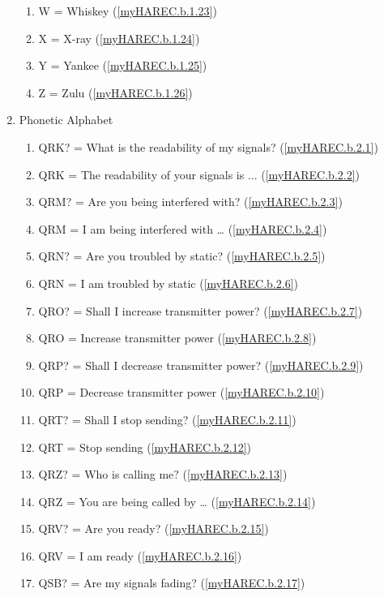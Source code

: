 \begin{enumerate}[noitemsep]
\begin{enumerate}[noitemsep]
\item W = Whiskey (\ref{myHAREC.b.1.23})\label{HAREC.b.1.23}
\item X = X-ray (\ref{myHAREC.b.1.24})\label{HAREC.b.1.24}
\item Y = Yankee (\ref{myHAREC.b.1.25})\label{HAREC.b.1.25}
\item Z = Zulu (\ref{myHAREC.b.1.26})\label{HAREC.b.1.26}
\end{enumerate}
\item Phonetic Alphabet
\begin{enumerate}[noitemsep]
\item QRK? = What is the readability of my signals? (\ref{myHAREC.b.2.1})\label{HAREC.b.2.1}
\item QRK  = The readability of your signals is ... (\ref{myHAREC.b.2.2})\label{HAREC.b.2.2}
\item QRM? = Are you being interfered with? (\ref{myHAREC.b.2.3})\label{HAREC.b.2.3}
\item QRM  = I am being interfered with … (\ref{myHAREC.b.2.4})\label{HAREC.b.2.4}
\item QRN? = Are you troubled by static? (\ref{myHAREC.b.2.5})\label{HAREC.b.2.5}
\item QRN  = I am troubled by static (\ref{myHAREC.b.2.6})\label{HAREC.b.2.6}
\item QRO? = Shall I increase transmitter power? (\ref{myHAREC.b.2.7})\label{HAREC.b.2.7}
\item QRO  = Increase transmitter power (\ref{myHAREC.b.2.8})\label{HAREC.b.2.8}
\item QRP? = Shall I decrease transmitter power? (\ref{myHAREC.b.2.9})\label{HAREC.b.2.9}
\item QRP  = Decrease transmitter power (\ref{myHAREC.b.2.10})\label{HAREC.b.2.10}
\item QRT? = Shall I stop sending? (\ref{myHAREC.b.2.11})\label{HAREC.b.2.11}
\item QRT  = Stop sending (\ref{myHAREC.b.2.12})\label{HAREC.b.2.12}
\item QRZ? = Who is calling me? (\ref{myHAREC.b.2.13})\label{HAREC.b.2.13}
\item QRZ  = You are being called by … (\ref{myHAREC.b.2.14})\label{HAREC.b.2.14}
\item QRV? = Are you ready? (\ref{myHAREC.b.2.15})\label{HAREC.b.2.15}
\item QRV  = I am ready (\ref{myHAREC.b.2.16})\label{HAREC.b.2.16}
\item QSB? = Are my signals fading? (\ref{myHAREC.b.2.17})\label{HAREC.b.2.17}

\end{enumerate}
\end{enumerate}
